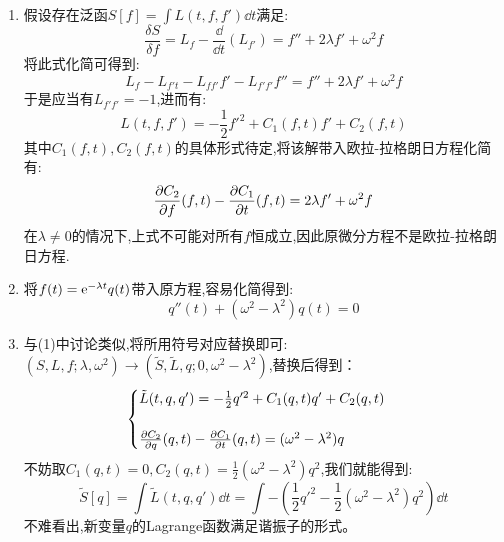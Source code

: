 \begin{solution}
    \begin{enumerate}[label=(\arabic*)]
        \item 假设存在泛函\(S[f]=\int L(t,f,f') \dd t\)满足:
        \[
        \frac{\delta S}{\delta f}=L_f-\frac{\dd}{\dd t}(L_{f'})=f''+2\lambda f'+\omega^2 f
        \]
        将此式化简可得到:
        \[
        L_f-L_{f't}-L_{ff'}f'-L_{f'f'}f''=f''+2\lambda f'+\omega^2 f
        \]
        于是应当有\(L_{f'f'}=-1\),进而有:
        \[
        L(t,f,f')=-\frac12f'^2+C_1(f,t)f'+C_2(f,t)
        \]
        其中\(C_1(f,t),C_2(f,t)\)的具体形式待定,将该解带入欧拉-拉格朗日方程化简有:
        \[
        \frac{\partial C_2}{\partial f}(f,t)-\frac{\partial C_1}{\partial t}(f,t)=2\lambda f'+\omega^2f
        \]
        在\(\lambda\neq 0\)的情况下,上式不可能对所有\(f\)恒成立,因此原微分方程不是欧拉-拉格朗日方程.
        \item 将\(f(t)=\mathrm e ^{-\lambda t}q(t)\)带入原方程,容易化简得到:\[
        q''(t)+(\omega^2 - \lambda^2)q(t)=0
        \]
        \item 与(1)中讨论类似,将所用符号对应替换即可:\((S,L,f;\lambda,\omega^2)\rightarrow(\tilde{S},\tilde{L},q;0,\omega^2-\lambda^2)\),替换后得到：
        \[
        \begin{cases}
            \tilde{L}(t,q,q')=-\frac12q'^2+C_1(q,t)q'+C_2(q,t)\\
            \\
            \frac{\partial C_2}{\partial q}(q,t)-\frac{\partial C_1}{\partial t}(q,t)=(\omega^2-\lambda^2)q
        \end{cases}
        \]
        不妨取\(C_1(q,t)=0,C_2(q,t)=\frac12(\omega^2-\lambda^2)q^2\),我们就能得到:
        \[
        \tilde{S}[q]=\int\tilde{L}(t,q,q')\dd t=\int-\left( 
            \frac12q'^2-\frac12(\omega^2-\lambda^2)q^2
        \right)\dd t
        \]
        不难看出,新变量\(q\)的Lagrange函数满足谐振子的形式。
    \end{enumerate}
\end{solution}

